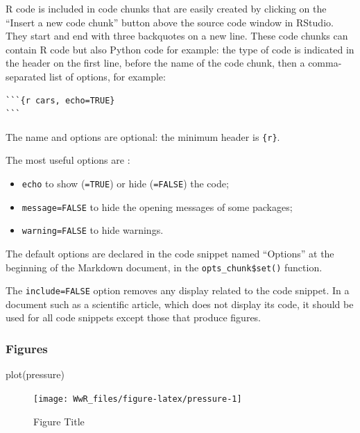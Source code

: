 \documentclass[
  12pt,
  american,
  a4paper,
  extrafontsizes,onecolumn,openright
  ]{memoir}
\newenvironment{Shaded}{\begin{snugshade}}{\end{snugshade}}
\newcommand{\FunctionTok}[1]{\textcolor[rgb]{0.00,0.00,0.00}{#1}}
\newcommand{\NormalTok}[1]{#1}
\providecommand{\tightlist}{%
  \setlength{\itemsep}{0pt}\setlength{\parskip}{0pt}}
\begin{document}
R code is included in code chunks that are easily created by clicking on the \enquote{Insert a new code chunk} button above the source code window in RStudio.
They start and end with three backquotes on a new line.
These code chunks can contain R code but also Python code for example: the type of code is indicated in the header on the first line, before the name of the code chunk, then a comma-separated list of options, for example:

\begin{verbatim}
```{r cars, echo=TRUE}
```
\end{verbatim}

The name and options are optional: the minimum header is \texttt{\{r\}}.

The most useful options are :

\begin{itemize}
\tightlist
\item
  \texttt{echo} to show (\texttt{=TRUE}) or hide (\texttt{=FALSE}) the code;
\item
  \texttt{message=FALSE} to hide the opening messages of some packages;
\item
  \texttt{warning=FALSE} to hide warnings.
\end{itemize}

The default options are declared in the code snippet named \enquote{Options} at the beginning of the Markdown document, in the \texttt{opts\_chunk\$set()} function.

The \texttt{include=FALSE} option removes any display related to the code snippet.
In a document such as a scientific article, which does not display its code, it should be used for all code snippets except those that produce figures.

\hypertarget{figures}{%
\subsubsection{Figures}\label{figures}}

\scriptsize

\begin{Shaded}
\begin{Highlighting}[]
\FunctionTok{plot}\NormalTok{(pressure)}
\end{Highlighting}
\end{Shaded}

\begin{figure}

{\centering \texttt{[image: WwR\_files/figure-latex/pressure-1]} 

}

\caption{Figure Title}\label{fig:pressure}
\end{figure}
\end{document}
